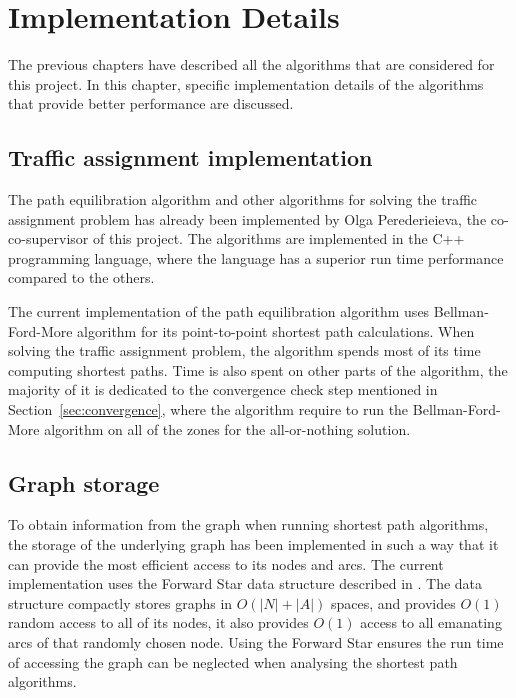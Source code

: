\chapter{Implementation Details} \label{chap:implementation}
The previous chapters have described all the algorithms that are considered for this project.
In this chapter, specific implementation details of the algorithms that provide better performance are discussed.

\section{Traffic assignment implementation}
The path equilibration algorithm and other algorithms for solving the traffic assignment problem has already been implemented by Olga Perederieieva, the co-co-supervisor of this project.
The algorithms are implemented in the C++ programming language,
where the language has a superior run time performance compared to the others.

The current implementation of the path equilibration algorithm uses Bellman-Ford-More algorithm for its point-to-point shortest path calculations.
When solving the traffic assignment problem,
the algorithm spends most of its time computing shortest paths.
Time is also spent on other parts of the algorithm,
the majority of it is dedicated to the convergence check step mentioned in Section~\ref{sec:convergence},
where the algorithm require to run the Bellman-Ford-More algorithm on all of the zones for the all-or-nothing solution.

\section{Graph storage}
To obtain information from the graph when running shortest path algorithms,
the storage of the underlying graph has been implemented in such a way that it can provide the most efficient access to its nodes and arcs.
The current implementation uses the Forward Star data structure described in \citet{Sheffi}.
The data structure compactly stores graphs in $O(|N|+|A|)$ spaces,
and provides $O(1)$ random access to all of its nodes,
it also provides $O(1)$ access to all emanating arcs of that randomly chosen node.
Using the Forward Star ensures the run time of accessing the graph can be neglected when analysing the shortest path algorithms.

